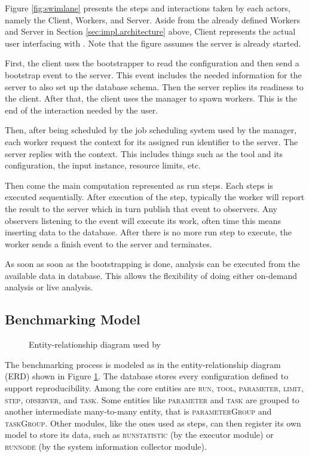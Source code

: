 Figure \ref{fig:swimlane} presents the steps and interactions taken by each actors, namely the Client, Workers, and Server.
Aside from the already defined Workers and Server in Section \ref{sec:impl.architecture} above, Client represents the actual user interfacing with \OurBenchmarkingTool.
Note that the figure assumes the server is already started.

First, the client uses the bootstrapper to read the configuration and then send a bootstrap event to the server.
This event includes the needed information for the server to also set up the database schema.
Then the server replies its readiness to the client.
After that, the client uses the manager to spawn workers.
This is the end of the interaction needed by the user.

Then, after being scheduled by the job scheduling system used by the manager, each worker request the context for its assigned run identifier to the server.
The server replies with the context.
This includes things such as the tool and its configuration, the input instance, resource limits, etc.

Then come the main computation represented as run steps.
Each steps is executed sequentially.
After execution of the step, typically the worker will report the result to the server which in turn publish that event to observers.
Any observers listening to the event will execute its work, often time this means inserting data to the database. After there is no more run step to execute, the worker sends a finish event to the server and terminates.

As soon as soon as the bootstrapping is done, analysis can be executed from the available data in database.
This allows the flexibility of doing either on-demand analysis or live analysis.


\subsection{Benchmarking Model}

\begin{figure}
    \centering
    \caption{Entity-relationship diagram used by \OurBenchmarkingTool}
    \label{fig:erd}
\end{figure}

The benchmarking process is modeled as in the entity-relationship diagram (ERD) shown in Figure \ref{fig:erd}.
The database stores every configuration defined to support reproducibility.
Among the core entities are \textsc{run}, \textsc{tool}, \textsc{parameter}, \textsc{limit}, \textsc{step}, \textsc{observer}, and \textsc{task}.
Some entities like \textsc{parameter} and \textsc{task} are grouped to another intermediate many-to-many entity, that is \textsc{parameterGroup} and \textsc{taskGroup}.
Other modules, like the ones used as steps, can then register its own model to store its data, such as \textsc{runstatistic} (by the executor module) or \textsc{runnode} (by the system information collector module).

